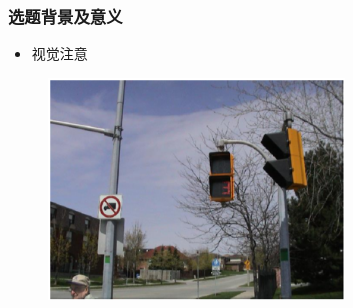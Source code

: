 \documentclass[notheorems,mathserif,table,compress]{beamer}  %
\begin{document}
\begin{frame}
  \frametitle{选题背景及意义}
  \begin{itemize}
  \item 视觉注意
  \end{itemize}
\begin{figure}[!htb] %
\centering
\includegraphics[width=0.7\textwidth]{nature.png}
\label{fig:2}
\end{figure}
\end{frame}
\end{document}
